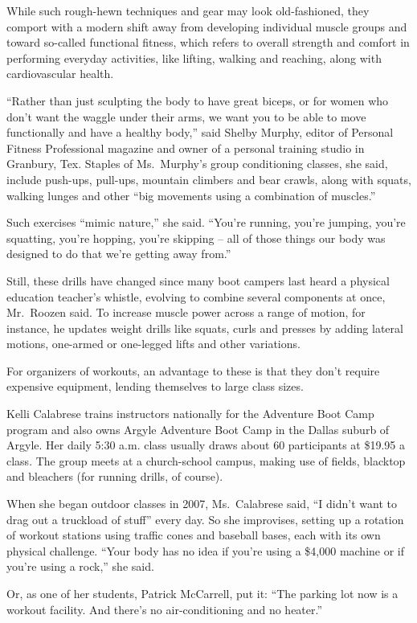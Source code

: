 ﻿\documentclass[12pt]{article}
\begin{document}
While such rough-hewn techniques and gear may look old-fashioned, they comport with a modern shift
away from developing individual muscle groups and toward so-called functional fitness, which refers
to overall strength and comfort in performing everyday activities, like lifting, walking and
reaching, along with cardiovascular health.

``Rather than just sculpting the body to have great biceps, or for women who don't want the waggle
under their arms, we want you to be able to move functionally and have a healthy body,'' said Shelby
Murphy, editor of Personal Fitness Professional magazine and owner of a personal training studio in
Granbury, Tex. Staples of Ms.~Murphy's group conditioning classes, she said, include push-ups,
pull-ups, mountain climbers and bear crawls, along with squats, walking lunges and other ``big
movements using a combination of muscles.''

Such exercises ``mimic nature,'' she said. ``You're running, you're jumping, you're squatting,
you're hopping, you're skipping -- all of those things our body was designed to do that we're
getting away from.''

Still, these drills have changed since many boot campers last heard a physical education teacher's
whistle, evolving to combine several components at once, Mr.~Roozen said. To increase muscle power
across a range of motion, for instance, he updates weight drills like squats, curls and presses by
adding lateral motions, one-armed or one-legged lifts and other variations.

For organizers of workouts, an advantage to these is that they don't require expensive equipment,
lending themselves to large class sizes.

Kelli Calabrese trains instructors nationally for the Adventure Boot Camp program and also owns
Argyle Adventure Boot Camp in the Dallas suburb of Argyle. Her daily 5:30 a.m. class usually draws
about 60 participants at \$19.95 a class. The group meets at a church-school campus, making use of
fields, blacktop and bleachers (for running drills, of course).

When she began outdoor classes in 2007, Ms.~Calabrese said, ``I didn't want to drag out a truckload
of stuff'' every day. So she improvises, setting up a rotation of workout stations using traffic
cones and baseball bases, each with its own physical challenge. ``Your body has no idea if you're
using a \$4,000 machine or if you're using a rock,'' she said.

Or, as one of her students, Patrick McCarrell, put it: ``The parking lot now is a workout facility.
And there's no air-conditioning and no heater.''
\end{document}

